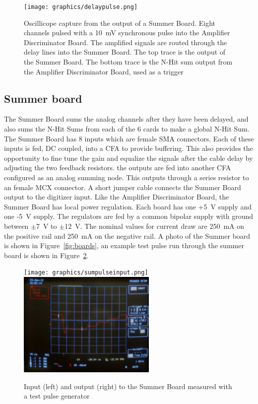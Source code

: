 \documentclass{JINST}
\begin{document}
\begin{figure}[ht]
	\begin{center}
		\texttt{[image: graphics/delaypulse.png]}
		\caption{Oscillicope capture from the output of a Summer Board.  Eight channels
			pulsed with a 10~mV synchronous pulse into the Amplifier Discriminator Board.  The amplified
			signals are routed through the delay lines into the Summer Board.  The top trace is
			the output of the Summer Board.  The bottom trace is the N-Hit sum output from the
		Amplifier Discriminator Board, used as a trigger
	\label{fig:multipulse}}
	\end{center}
\end{figure}

\subsection{Summer board}
\label{sec:Sum}
%
The Summer Board sums the analog channels after they have been
delayed, and also sums the N-Hit Sums from each of the 6 cards to make
a global N-Hit Sum.  The Summer Board has 8 inputs which are female
SMA connectors.  Each of these inputs is fed, DC coupled, into a CFA
to provide buffering.  This also provides the opportunity to fine tune
the gain and equalize the signals after the cable delay by adjusting
the two feedback resistors.  the outputs are fed into another CFA
configured as an analog summing node.  This outputs through a series
resistor to an female MCX connector.  A short jumper cable connects
the Summer Board output to the digitizer input.  Like the Amplifier
Discriminator Board, the Summer Board has local power regulation.
Each board has one +5~V supply and one -5~V supply.  The regulators are
fed by a common bipolar supply with ground between $\pm$7~V to $\pm$12~V.
The nominal values for current draw are 250~mA on the positive
rail and 250~mA on the negative rail.  A photo of the Summer
board is shown in Figure~\ref{fig:boards}, an example test pulse run
through the summer board is shown in Figure~\ref{fig:summerpulse}.

\begin{figure}[ht]
	\begin{center}
		\texttt{[image: graphics/sumpulseinput.png]}
		\includegraphics[height=2in, keepaspectratio=true]{graphics/sumpulseoutput.png}
		\caption{Input (left) and output (right) to the Summer Board measured with a test pulse generator
		\label{fig:summerpulse}}
	\end{center}
\end{figure}
\end{document}
